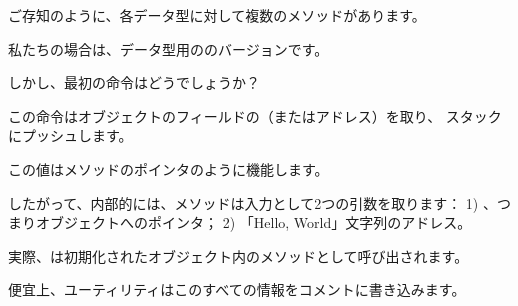 ご存知のように、各データ型に対して複数のメソッドがあります。

私たちの場合は、データ型用ののバージョンです。

しかし、最初の命令はどうでしょうか？

この命令はオブジェクトのフィールドの（またはアドレス）を取り、
スタックにプッシュします。

この値はメソッドのポインタのように機能します。

したがって、内部的には、メソッドは入力として2つの引数を取ります：
1) 、つまりオブジェクトへのポインタ；
2) 「Hello, World」文字列のアドレス。

実際、は初期化されたオブジェクト内のメソッドとして呼び出されます。

便宜上、ユーティリティはこのすべての情報をコメントに書き込みます。